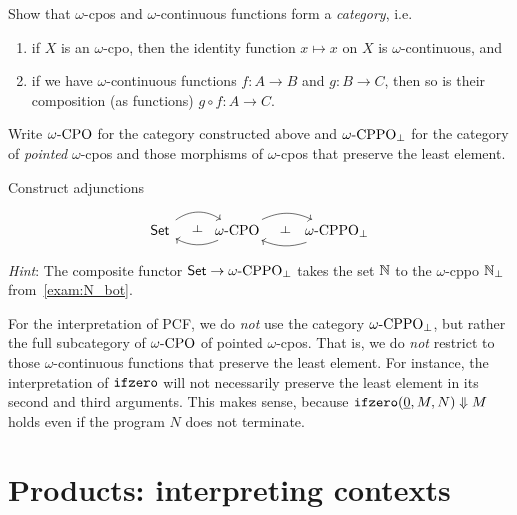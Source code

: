 \begin{exercise}\label{exer:category-of-cpos}
  Show that \(\omega\)-cpos and \(\omega\)-continuous functions form a
  \emph{category}, i.e.\
  \begin{enumerate}
  \item if \(X\) is an \(\omega\)-cpo, then the identity function
    \(x \mapsto x\) on \(X\) is \(\omega\)-continuous, and
  \item if we have \(\omega\)-continuous functions \(f \colon A \to B\) and
    \(g \colon B \to C\), then so is their composition (as functions)
    \(g \circ f \colon A \to C\). \qedhere
  \end{enumerate}
\end{exercise}

\begin{exercise}\label{exer:adjunctions}

  Write \(\omegaCPO\) for the category constructed above and \(\omegaCPPObot\)
  for the category of \emph{pointed} \(\omega\)-cpos and those morphisms of
  \(\omega\)-cpos that preserve the least element.

  Construct adjunctions
  \[
  \begin{tikzcd}
    \Set
    \arrow[r, ""{name=F}, bend left=35] &
    \omegaCPO
    \arrow[l, ""{name=G}, bend left=25]
    \arrow[phantom, from=F, to=G, "\dashv" rotate=-90]
    \arrow[r, ""{name=F}, bend left=25] &
    \omegaCPPObot
    \arrow[l, ""{name=G}, bend left=20]
    \arrow[phantom, from=F, to=G, "\dashv" rotate=-90]
  \end{tikzcd}
\]
\emph{Hint}: The composite functor \(\Set \to \omegaCPPObot\) takes the set \(\mathbb N\) to
the \(\omega\)-cppo \(\mathbb N_\bot\) from~\cref{exam:N_bot}.
\end{exercise}

\begin{remark}
  For the interpretation of PCF, we do \emph{not} use the category
  \(\omegaCPPObot\), but rather the full subcategory of \(\omegaCPO\) of pointed
  \(\omega\)-cpos. That is, we do \emph{not} restrict to those
  \(\omega\)-continuous functions that preserve the least element.
  For instance, the interpretation of \(\operatorname{\mathtt{ifzero}}\) will not necessarily preserve
  the least element in its second and third arguments.
  This makes sense, because \(\operatorname{\mathtt{ifzero}}(\underline{0},M,N) \Downarrow M\) holds even
  if the program \(N\) does not terminate.
\end{remark}

\section{Products: interpreting contexts}

